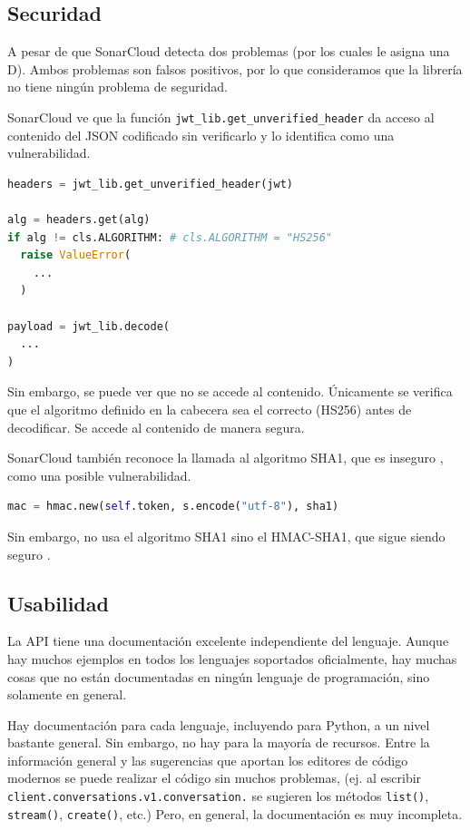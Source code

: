 \documentclass{article}
\begin{document}
\subsection{Securidad}

A pesar de que SonarCloud detecta dos problemas
(por los cuales le asigna una D).
Ambos problemas son falsos positivos, 
por lo que consideramos que la librería no tiene ningún problema de seguridad.

\hfill

SonarCloud ve que la función \verb|jwt_lib.get_unverified_header|
da acceso al contenido del JSON codificado sin verificarlo
y lo identifica como una vulnerabilidad.

\begin{lstlisting}[language=Python]
headers = jwt_lib.get_unverified_header(jwt)

alg = headers.get(alg)
if alg != cls.ALGORITHM: # cls.ALGORITHM = "HS256"
  raise ValueError(
    ...
  )

payload = jwt_lib.decode(
  ...
)
\end{lstlisting}

Sin embargo, se puede ver que no se accede al contenido.
Únicamente se verifica que el algoritmo definido en la cabecera
sea el correcto (HS256) antes de decodificar.
Se accede al contenido de manera segura.

\hfill

SonarCloud también reconoce la llamada al algoritmo SHA1,
que es inseguro \cite{sha1-broken},
como una posible vulnerabilidad.

\begin{lstlisting}[language=Python]
mac = hmac.new(self.token, s.encode("utf-8"), sha1)
\end{lstlisting}

Sin embargo, no usa el algoritmo SHA1
sino el HMAC-SHA1, que sigue siendo seguro \cite{hmac-sha1}.

\subsection{Usabilidad}

La API tiene una documentación excelente independiente del lenguaje.
Aunque hay muchos ejemplos en todos los lenguajes soportados oficialmente,
hay muchas cosas que no están documentadas 
en ningún lenguaje de programación,
sino solamente en general.

Hay documentación para cada lenguaje,
incluyendo para Python,
a un nivel bastante general.
Sin embargo, no hay para la mayoría de recursos.
Entre la información general
y las sugerencias que aportan los editores de código modernos
se puede realizar el código sin muchos problemas,
(ej. al escribir \verb|client.conversations.v1.conversation.|
se sugieren los métodos
\verb|list()|, \verb|stream()|, \verb|create()|, etc.)
Pero, en general, la documentación es muy incompleta.
\end{document}
